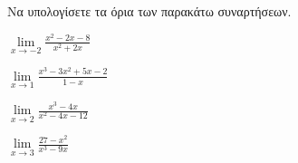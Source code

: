 Να υπολογίσετε τα όρια των παρακάτω συναρτήσεων.
\begin{multicols}{2}
\begin{alist}
\item $ \lim\limits_{x\to -2}\frac{x^2-2x-8}{x^2+2x} $
\item $ \lim\limits_{x\to 1}\frac{x^3-3x^2+5x-2}{1-x} $
\item $ \lim\limits_{x\to2}\frac{x^3-4x}{x^2-4x-12} $
\item $ \lim\limits_{x\to3}{\frac{27-x^2}{x^3-9x}} $
\end{alist}
\end{multicols}
